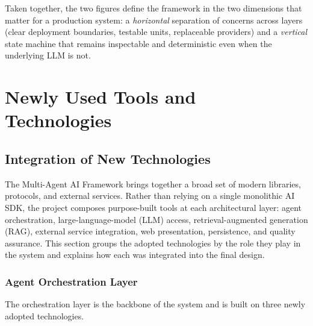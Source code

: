 \documentclass[11pt,a4paper]{report}
\begin{document}
\noindent Taken together, the two figures define the framework in the two
dimensions that matter for a production system: a \emph{horizontal} separation
of concerns across layers (clear deployment boundaries, testable units,
replaceable providers) and a \emph{vertical} state machine that remains
inspectable and deterministic even when the underlying LLM is not.

\chapter{Newly Used Tools and Technologies}

\section{Integration of New Technologies}

The Multi-Agent AI Framework brings together a broad set of modern libraries,
protocols, and external services. Rather than relying on a single monolithic
AI SDK, the project composes purpose-built tools at each architectural layer:
agent orchestration, large-language-model (LLM) access, retrieval-augmented
generation (RAG), external service integration, web presentation, persistence,
and quality assurance. This section groups the adopted technologies by the
role they play in the system and explains how each was integrated into the
final design.

\subsection{Agent Orchestration Layer}

The orchestration layer is the backbone of the system and is built on three
newly adopted technologies.
\end{document}
